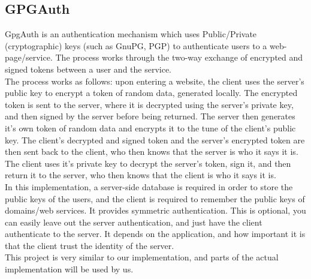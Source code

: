 \documentclass[11pt]{article}
\begin{document}
\subsection{GPGAuth} \label{subsec:gpgauth}
GpgAuth\cite{gpgauth} is an authentication mechanism which uses Public/Private (cryptographic) keys (such as GnuPG, PGP) to authenticate users to a web-page/service.  The process works through the two-way exchange of encrypted and signed tokens between a user and the service.\\
	The process works as follows: upon entering a website, the client uses the server's public key to encrypt a token of random data, generated locally.  The encrypted token is sent to the server, where it is decrypted using the server's private key, and then signed by the server before being returned.  The server then generates it's own token of random data and encrypts it to the tune of the client's public key.  The client's decrypted and signed token  and the server's encrypted token are then sent back to the client, who then knows that the server is who it says it is.  The client uses it's private key to decrypt the server's token, sign it, and then return it to the server, who then knows that the client is who it says it is.\\
	In this implementation, a server-side database is required in order to store the public keys of the users, and the client is required to remember the public keys of domains/web services. It provides symmetric authentication. This is optional, you can easily leave out the server authentication, and just have the client authenticate to the server. It depends on the application, and how important it is that the client trust the identity of the server.\\
	This project is very similar to our implementation, and parts of the actual implementation will be used by us.
\end{document}
